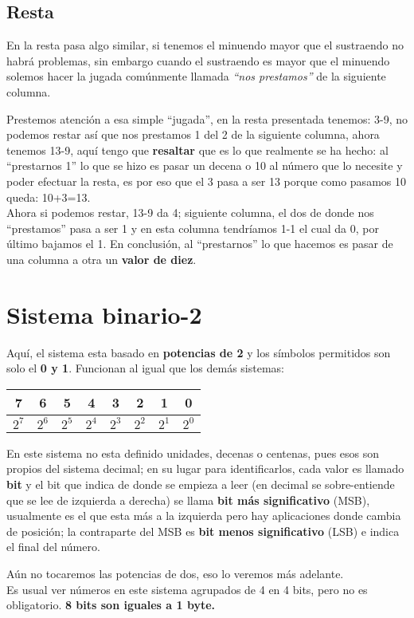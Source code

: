 \documentclass[
	12pt, %
	fleqn, %
	a4paper, %
	oneside, %
]{LegrandOrangeBook}
\begin{document}
\subsection{Resta}
En la resta pasa algo similar, si tenemos el minuendo mayor que el sustraendo no habrá problemas, sin embargo cuando el sustraendo es mayor que el minuendo solemos hacer la jugada comúnmente llamada \textit{``nos prestamos''} de la siguiente columna.
\begin{center}
\end{center}
Prestemos atención a esa simple ``jugada'',  en la resta presentada tenemos: 3-9, no podemos restar así que nos prestamos 1 del 2 de la siguiente columna, ahora tenemos 13-9, aquí tengo que \textbf{resaltar} que es lo que realmente se ha hecho: al ``prestarnos 1'' lo que se hizo es pasar un decena o 10 al número que lo necesite y poder efectuar la resta, es por eso que el 3 pasa a ser 13 porque como pasamos 10 queda: 10+3=13.\\
Ahora si podemos restar, 13-9 da 4; siguiente columna, el dos de donde nos ``prestamos'' pasa a ser 1 y en esta columna tendríamos 1-1 el cual da 0, por último bajamos el 1. En conclusión, al ``prestarnos'' lo que hacemos es pasar de una columna a otra un \textbf{valor de diez}.
\section{Sistema binario-2}
Aquí, el sistema esta basado en \textbf{potencias de 2} y los símbolos permitidos son solo el \textbf{0 y 1}. Funcionan al igual que los demás sistemas:
\begin{center}
\begin{tabular}{|c|c|c|c|c|c|c|c|}
\hline
7     & 6     & 5     & 4     & 3     & 2     & 1     & 0     \\ \hline
$2^7$ & $2^6$ & $2^5$ & $2^4$ & $2^3$ & $2^2$ & $2^1$ & $2^0$ \\ \hline
\end{tabular}
\end{center}
\begin{remark}
En este sistema no esta definido unidades, decenas o centenas, pues esos son propios del sistema decimal; en su lugar para identificarlos, cada valor es llamado \textbf{bit} y el bit que indica de donde se empieza a leer (en decimal se sobre-entiende que se lee de izquierda a derecha) se llama \textbf{bit más significativo} (MSB), usualmente es el que esta más a la izquierda pero hay aplicaciones donde cambia de posición; la contraparte del MSB es \textbf{bit menos significativo} (LSB) e indica el final del número.
\end{remark}
Aún no tocaremos las potencias de dos, eso lo veremos más adelante.\\
Es usual ver números en este sistema agrupados de 4 en 4 bits, pero no es obligatorio. \textbf{8 bits son iguales a 1 byte.}
\end{document}
